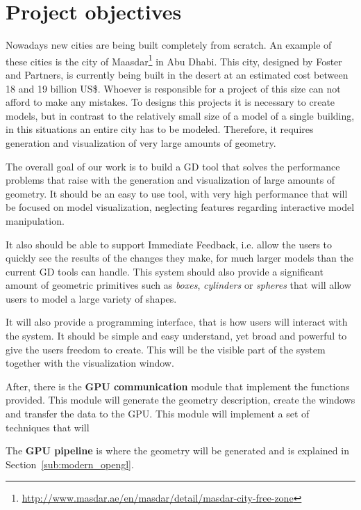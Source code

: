 
\section{Project objectives} %
\label{sec:project_objectives}

Nowadays new cities are being built  completely from scratch. An example of these cities is the city of Maasdar\footnote{\url{http://www.masdar.ae/en/masdar/detail/masdar-city-free-zone}} in Abu Dhabi. This city, designed by Foster and Partners, is currently being built in the desert at an estimated cost between 18 and 19 billion US\$. Whoever is responsible for a project of this size can not afford to make any mistakes.
To designs this projects it is necessary to create models, but in contrast to the relatively small size of a model of a single building, in this situations an entire city has to be modeled. Therefore, it requires generation and visualization of very large amounts of geometry.

The overall goal of our work is to build a GD tool that solves the performance problems that raise with the generation and visualization of large amounts of geometry. It should be an easy to use tool, with very high performance that will be focused on model visualization, neglecting features regarding interactive model manipulation.

It also should be able to support Immediate Feedback, i.e. allow the users to quickly see the results of the changes they make, for much larger models than the current GD tools can handle. This system should also provide a significant amount of geometric primitives such as \emph{boxes}, \emph{cylinders} or \emph{spheres} that will allow users to model a large variety of shapes.

It will also provide a programming interface, that is how users will interact with the system. It should be simple and easy understand, yet broad and powerful to give the users freedom to create. This will be the visible part of the system together with the visualization window.

After, there is the \textbf{GPU communication} module that implement the functions provided. This module will generate the geometry description, create the windows and transfer the data to the GPU. This module will implement a set of techniques that will 

The \textbf{GPU pipeline} is where the geometry will be generated and is explained in Section~\ref{sub:modern_opengl}.

